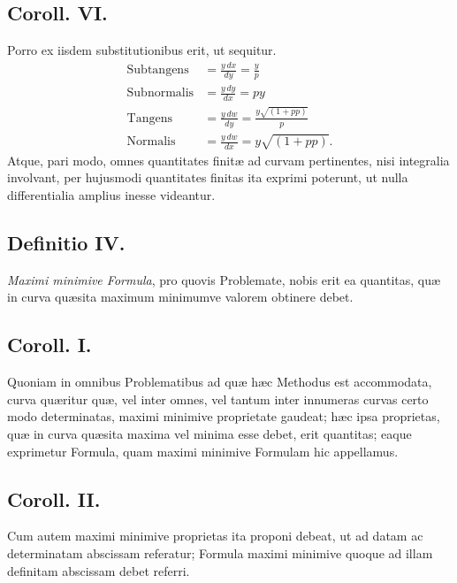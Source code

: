 \subsection*{Coroll. VI.}
Porro ex iisdem substitutionibus erit, ut sequitur.
\[
\begin{aligned}
\text{Subtangens}&=\frac{y\,dx}{dy}=\frac{y}{p}\\
\text{Subnormalis}&=\frac{y\,dy}{dx}=py\\
\text{Tangens}&=\frac{y\,dw}{dy}=\frac{y\sqrt{(1+pp)}}{p}\\
\text{Normalis}&=\frac{y\,dw}{dx}=y\sqrt{(1+pp)}.
\end{aligned}
\]
Atque, pari modo, omnes quantitates finitæ ad curvam pertinentes, nisi
integralia involvant, per hujusmodi quantitates finitas ita exprimi poterunt,
ut nulla differentialia amplius inesse videantur.

\subsection*{Definitio IV.}
\textit{Maximi minimive Formula}, pro quovis Problemate, nobis erit ea quantitas, quæ in curva quæsita maximum minimumve valorem obtinere debet.

\subsection*{Coroll. I.}
Quoniam in omnibus Problematibus ad quæ hæc Methodus est accommodata, curva quæritur quæ, vel inter omnes, vel tantum inter innumeras curvas certo modo determinatas, maximi minimive proprietate gaudeat; hæc ipsa proprietas, quæ in curva quæsita maxima vel minima esse debet, erit quantitas; eaque exprimetur Formula, quam maximi minimive Formulam hic appellamus.

\subsection*{Coroll. II.}
Cum autem maximi minimive proprietas ita proponi debeat, ut ad datam ac determinatam abscissam referatur; Formula maximi minimive quoque ad illam definitam abscissam debet referri.

